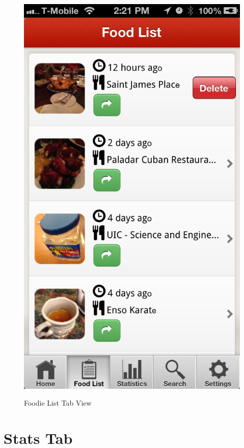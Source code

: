 \begin{figure}
{	\includegraphics[width=\figwidth, totalheight=\figheight, keepaspectratio]{./screenshots/foodlist-delete.png}} \hfill
	\caption{Foodie List Tab View}
	\label{fig:foodielisttab}
\end{figure}


\section{Stats Tab} %
\label{sec:stats_tab}

